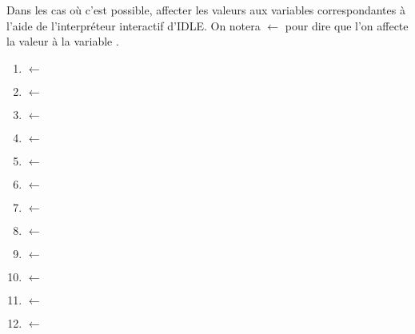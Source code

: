 Dans les cas où c'est possible, affecter les valeurs aux variables correspondantes à l'aide de l'interpréteur interactif d'IDLE. 
On notera  $\leftarrow$  pour dire que l'on affecte la valeur  à la variable .

\begin{multicols}{2}
  \begin{enumerate}[label=\emph{\alph*)}]
    \item {} $\leftarrow$ 
    \item {} $\leftarrow$ 
    \item {} $\leftarrow$ \pyv{[]}
    \item {} $\leftarrow$ \pyv{[1,2,3]}
    \item {} $\leftarrow$ 
    \item {} $\leftarrow$ 
    \item {} $\leftarrow$ 
    \item {} $\leftarrow$ 
    \item {} $\leftarrow$ 
    \item {} $\leftarrow$ 
    \item {} $\leftarrow$ 
    \item {} $\leftarrow$ 
  \end{enumerate}
\end{multicols}